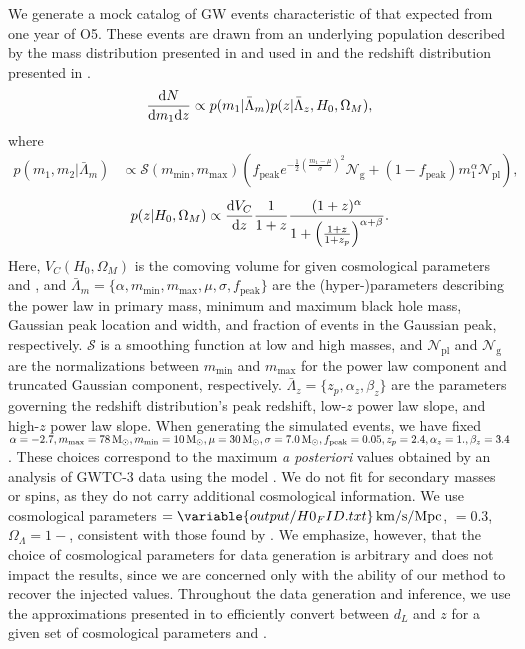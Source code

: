 \documentclass[]{aastex631}
\begin{document}
We generate a mock catalog of \ac{GW} events characteristic of that expected from one year of \acf{O5}. 
These events are drawn from an underlying population described by the \plp{} mass distribution presented in \citet{talbot_measuring_2018} and used in \citet{abbott_binary_2019, abbott_population_2023} and the redshift distribution presented in \citet{callister_shouts_2020}.
\begin{equation}
\label{eq:underlying population}
    \frac{\diff N}{\diff m_1 \diff z} \propto p(m_1|\bar{\Lambda}_m) p(z|\bar{\Lambda}_z, H_0, \Omega_M),
\end{equation}
where 
\begin{align}
    p(m_1,m_2|\bar{\Lambda}_m) &\propto \mathcal{S}(m_{\min},m_{\max})
    \left( f_{\text{peak}}e^{-\frac{1}{2}(\frac{m_1-\mu}{\sigma})^2}\mathcal{N}_{\text{g}} +
    (1-f_{\text{peak}})m_1^{\alpha}\mathcal{N}_{\text{pl}} \right) ,
\label{eq:underlying mass dist}
\end{align}
\begin{equation}
    p(z|H_0, \Omega_M) \propto \frac{\diff V_C}{\diff z} \frac{1}{1+z} \frac{(1+z)^\alpha}{1+\left(\frac{1+z}{1+z_p}\right)^{\alpha+\beta}}.
    \label{eq:underlying redshift dist}
\end{equation}
Here, $V_C(H_0, \Omega_M)$ is the comoving volume for given cosmological parameters \Ho{} and \Omm{}, and $\bar{\Lambda}_m = \{\alpha, m_{\min}, m_{\max}, \mu, \sigma, f_{\text{peak}}\}$ are the (hyper-)parameters describing the power law in primary mass, minimum and maximum black hole mass, Gaussian peak location and width, and fraction of events in the Gaussian peak, respectively.
$\mathcal{S}$ is a smoothing function at low and high masses, and $\mathcal{N}_{\text{pl}}$ and $\mathcal{N}_{\text{g}}$ are the normalizations between  $m_{\min}$ and $m_{\max}$ for the power law component and truncated Gaussian component, respectively.
$\bar{\Lambda}_z = \{z_p,\alpha_z,\beta_z\}$ are the parameters governing the redshift distribution's peak redshift, low-$z$ power law slope, and high-$z$ power law slope.
When generating the simulated events, we have fixed $\alpha=-2.7,m_{\max}=78\,\text{M}_{\odot},m_{\min}=10\,\text{M}_{\odot}, \mu=30\,\text{M}_{\odot},\sigma=7.0\,\text{M}_{\odot}, f_{\text{peak}}=0.05,   z_p=2.4,\alpha_z=1.,\beta_z=3.4$.
These choices correspond to the maximum \emph{a posteriori} values obtained by an analysis of GWTC-3 data using the \plp{} model \citep{abbott_population_2023}.
We do not fit for secondary masses or spins, as they do not carry additional cosmological information.
We use cosmological parameters \Ho$=\variable{output/H0_FID.txt}\Hunits$, \Omm$=0.3$, $\Omega_\Lambda=1-$\Omm, consistent with those found by \citet{planck_collaboration_planck_2016}.
We emphasize, however, that the choice of cosmological parameters for data generation is arbitrary and does not impact the results, since we are concerned only with the ability of our method to recover the injected values.
Throughout the data generation and inference, we use the approximations presented in \citet{adachi_analytical_2012} to efficiently convert between $d_L$ and $z$ for a given set of cosmological parameters \Omm{} and \Ho.
\end{document}
